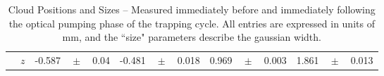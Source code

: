 \begin{table}[h!!!!t]
\begin{center}
\begin{tabular}{ c | r || lcl | lcl || lcl | lcl |}
								& $z$ & -0.587    & \!\!$\!\! \pm  \!\!$\!\! & 0.04   & -0.481  & \!\!$\!\! \pm  \!\!$\!\! & 0.018 & 0.969 & \!\!$\!\! \pm  \!\!$\!\! & 0.003 & 1.861 & \!\!$\!\! \pm  \!\!$\!\! & 0.013 \\
			\cline{2-14}
	\end{tabular}
	\end{center}
	\caption[Cloud Position and Size]{Cloud Positions and Sizes -- Measured immediately before and immediately following the optical pumping phase of the trapping cycle.  All entries are expressed in units of mm, and the ``size" parameters describe the gaussian width.}
	\label{table:cloudpositions}
\end{table}


%
%
